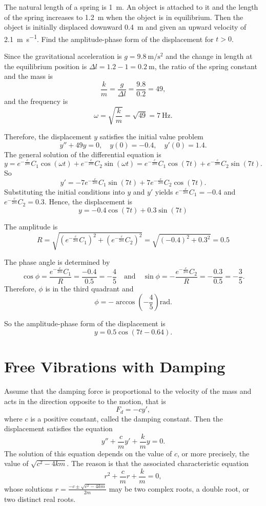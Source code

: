 \begin{exercise}
  The natural length of a spring is \SI{1}{\meter}. An object is attached to it and the length of the spring increases to \SI{1.2}{\meter} when the object is in equilibrium. Then the object is initially displaced downward \SI{0.4}{\meter} and given an upward velocity of \SI{2.1}{\meter\per\second}. Find the amplitude-phase form of the displacement for $t>0$.
\end{exercise}
\begin{exersol}
Since the gravitational acceleration is $g=\SI{9.8}{\meter\per\square\second}$ and the change in length at the equilibrium position is $\Delta l=1.2-1=0.2~\si{\meter}$, the ratio of the spring constant and the mass is  
\[\frac{k}{m}=\frac{g}{\Delta l}=\frac{9.8}{0.2}=49,\]
and the frequency is
\[\omega=\sqrt{\frac{k}{m}}=\sqrt{49}=\SI{7}{\Hz}.\] 

Therefore, the displacement $y$ satisfies the initial value problem
\[y'' + 49y=0, \quad y(0)=-0.4,\quad y'(0)=1.4.\]
The general solution of the differential equation is
\[y=e^{-\frac{c}{2m}}C_1\cos(\omega t)+e^{-\frac{c}{2m}}C_2\sin(\omega t) = e^{-\frac{c}{2m}}C_1\cos(7t)+e^{-\frac{c}{2m}}C_2\sin(7t).\]
So
\[y'=-7e^{-\frac{c}{2m}}C_1\sin(7t)+7e^{-\frac{c}{2m}}C_2\cos(7t).\]
Substituting the initial conditions into $y$ and $y'$ yields $e^{-\frac{c}{2m}}C_1=-0.4$ and $e^{-\frac{c}{2m}}C_2=0.3$. Hence, the displacement is
\[y=-0.4\cos(7t)+0.3\sin(7t)\]

The amplitude is
\[R=\sqrt{\left(e^{-\frac{c}{2m}}C_{1}\right)^{2}+\left(e^{-\frac{c}{2m}}C_{2}\right)^{2}}=\sqrt{(-0.4)^2+0.3^2}=0.5\]

The phase angle is determined by
\[\cos\phi = \frac{e^{-\frac{c}{2m}}C_{1}}{R}=\frac{-0.4}{0.5}=-\frac45\quad\text{and}\quad \sin\phi = -\frac{e^{-\frac{c}{2m}}C_{2}}{R}=-\frac{0.3}{0.5}=-\frac35.\]
Therefore, $\phi$ is in the third quadrant and
\[\phi = -\arccos\left(-\frac45\right)\text{rad}.\]

So the amplitude-phase form of the displacement is
\[y=0.5\cos(7t-0.64).\]
\end{exersol}

\section{Free Vibrations with Damping}
Assume that the damping force is proportional to the velocity of the mass and acts in the direction opposite to the motion, that is
\[F_d=-cy',\]
where $c$ is a positive constant, called the damping constant. Then the displacement satisfies the equation
\[y''+\frac{c}{m}y'+\frac{k}{m}y=0.\]
The solution of this equation depends on the value of $c$, or more precisely, the value of $\sqrt{c^2-4km}$. The reason is that the associated characteristic equation 
\[r^2+\frac{c}{m}r+\frac{k}{m}=0,\]
whose solutions
$r=\frac{-c\pm\sqrt{c^2-4km}}{2m}$
may be two complex roots, a double root, or two distinct real roots.

